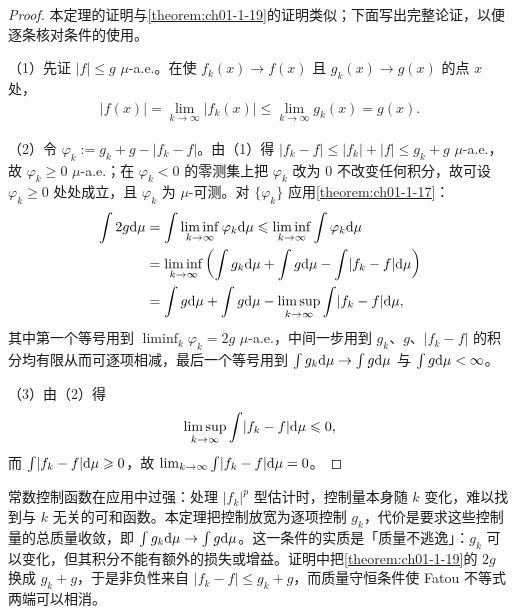 \documentclass[../../main.tex]{subfiles}%
\begin{document}
\begin{proof}
本定理的证明与\cref{theorem:ch01-1-19}的证明类似；下面写出完整论证，以便逐条核对条件的使用。%

（1）先证 $\lvert f\rvert\leqslant g$ $\mu$-a.e.。在使 $f_k(x)\to f(x)$ 且 $g_k(x)\to g(x)$ 的点 $x$ 处，
\begin{align*}
\lvert f(x)\rvert=\lim_{k\to\infty}\lvert f_k(x)\rvert\leqslant\lim_{k\to\infty}g_k(x)=g(x).
\end{align*}

（2）令 $\varphi_k:=g_k+g-\lvert f_k-f\rvert$。由（1）得 $\lvert f_k-f\rvert\leqslant\lvert f_k\rvert+\lvert f\rvert\leqslant g_k+g$ $\mu$-a.e.，故 $\varphi_k\geqslant0$ $\mu$-a.e.；在 $\varphi_k<0$ 的零测集上把 $\varphi_k$ 改为 $0$ 不改变任何积分，故可设 $\varphi_k\geqslant0$ 处处成立，且 $\varphi_k$ 为 $\mu$-可测。对 $\{\varphi_k\}$ 应用\cref{theorem:ch01-1-17}：%
\begin{align*}
\int 2g\mathrm{d}\mu
&=\int\liminf_{k\to\infty}\varphi_k\mathrm{d}\mu
\leqslant\liminf_{k\to\infty}\int\varphi_k\mathrm{d}\mu\\
&=\liminf_{k\to\infty}\left(\int g_k\mathrm{d}\mu+\int g\mathrm{d}\mu-\int\lvert f_k-f\rvert\mathrm{d}\mu\right)\\
&=\int g\mathrm{d}\mu+\int g\mathrm{d}\mu-\limsup_{k\to\infty}\int\lvert f_k-f\rvert\mathrm{d}\mu,
\end{align*}
其中第一个等号用到 $\liminf_{k}\varphi_k=2g$ $\mu$-a.e.，中间一步用到 $g_k$、$g$、$\lvert f_k-f\rvert$ 的积分均有限从而可逐项相减，最后一个等号用到 $\int g_k\mathrm{d}\mu\to\int g\mathrm{d}\mu$ 与 $\int g\mathrm{d}\mu<\infty$。

（3）由（2）得
\begin{align*}
\limsup_{k\to\infty}\int\lvert f_k-f\rvert\mathrm{d}\mu\leqslant0,
\end{align*}
而 $\int\lvert f_k-f\rvert\mathrm{d}\mu\geqslant0$，故 $\lim_{k\to\infty}\int\lvert f_k-f\rvert\mathrm{d}\mu=0$。
\end{proof}

\begin{remark}\label{remark:ch01-thm-1-20-动机}
常数控制函数在应用中过强：处理 $\lvert f_k\rvert^{p}$ 型估计时，控制量本身随 $k$ 变化，难以找到与 $k$ 无关的可和函数。本定理把控制放宽为逐项控制 $g_k$，代价是要求这些控制量的总质量收敛，即 $\int g_k\mathrm{d}\mu\to\int g\mathrm{d}\mu$。这一条件的实质是「质量不逃逸」：$g_k$ 可以变化，但其积分不能有额外的损失或增益。证明中把\cref{theorem:ch01-1-19}的 $2g$ 换成 $g_k+g$，于是非负性来自 $\lvert f_k-f\rvert\leqslant g_k+g$，而质量守恒条件使 Fatou 不等式两端可以相消。%
\end{remark}
\end{document}
